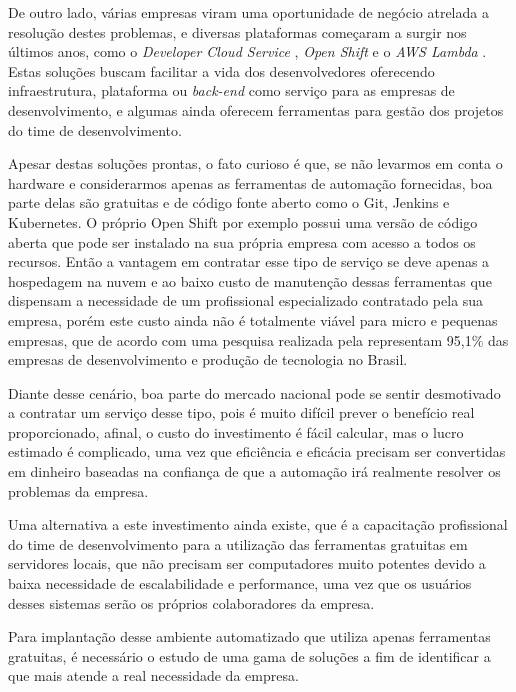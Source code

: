 \documentclass[
	12pt,				%
	openright,			%
	twoside,			%
	a4paper,			%
	english,			%
	french,				%
	spanish,			%
	brazil,				%
	]{abntex2}
\begin{document}
De outro lado, várias empresas viram uma oportunidade de negócio atrelada a resolução destes problemas, e diversas plataformas começaram a surgir nos últimos anos, como o \textit{Developer Cloud Service} \cite{Oracle:DevOps}, \textit{Open Shift} \cite{RedHat:OpenShift} e o \textit{AWS Lambda} \cite{Amazon:Lambda}. Estas soluções buscam facilitar a vida dos desenvolvedores oferecendo infraestrutura, plataforma ou \textit{back-end} como serviço para as empresas de desenvolvimento, e algumas ainda oferecem ferramentas para gestão dos projetos do time de desenvolvimento.

Apesar destas soluções prontas, o fato curioso é que, se não levarmos em conta o hardware e considerarmos apenas as ferramentas de automação fornecidas, boa parte delas são gratuitas e de código fonte aberto como o Git, Jenkins e Kubernetes. O próprio Open Shift por exemplo possui uma versão de código aberta que pode ser instalado na sua própria empresa com acesso a todos os recursos. Então a vantagem em contratar esse tipo de serviço se deve apenas a hospedagem na nuvem e ao baixo custo de manutenção dessas ferramentas que dispensam a necessidade de um profissional especializado contratado pela sua empresa, porém este custo ainda não é totalmente viável para micro e pequenas empresas, que de acordo com uma pesquisa realizada pela  representam 95,1\% das empresas de desenvolvimento e produção de tecnologia no Brasil.

Diante desse cenário, boa parte do mercado nacional pode se sentir desmotivado a contratar um serviço desse tipo, pois é muito difícil prever o benefício real proporcionado, afinal, o custo do investimento é fácil calcular, mas o lucro estimado é complicado, uma vez que eficiência e eficácia precisam ser convertidas em dinheiro baseadas na confiança de que a automação irá realmente resolver os problemas da empresa.

Uma alternativa a este investimento ainda existe, que é a capacitação profissional do time de desenvolvimento para a utilização das ferramentas gratuitas em servidores locais, que não precisam ser computadores muito potentes devido a baixa necessidade de escalabilidade e performance, uma vez que os usuários desses sistemas serão os próprios colaboradores da empresa.

Para implantação desse ambiente automatizado que utiliza apenas ferramentas gratuitas, é necessário o estudo de uma gama de soluções a fim de identificar a que mais atende a real necessidade da empresa.
\end{document}
